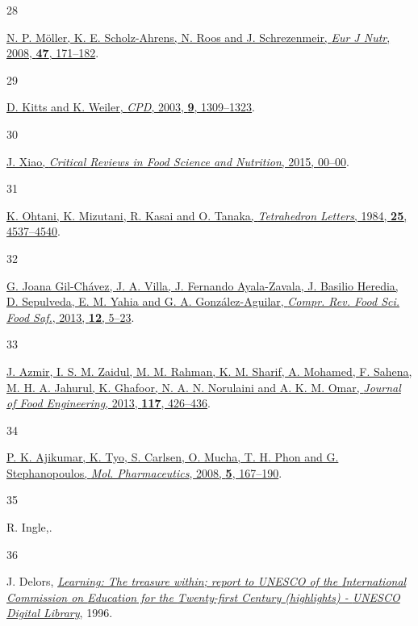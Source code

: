 \documentclass[
  letterpaper,
  DIV=11,
  numbers=noendperiod]{scrartcl}
\newlength{\cslhangindent}
\newlength{\csllabelwidth}
\newenvironment{CSLReferences}[2] %
 {\begin{list}{}{%
  \setlength{\itemindent}{0pt}
  \setlength{\leftmargin}{0pt}
  \setlength{\parsep}{0pt}
  \ifodd #1
   \setlength{\leftmargin}{\cslhangindent}
   \setlength{\itemindent}{-1\cslhangindent}
  \fi
  \setlength{\itemsep}{#2\baselineskip}}}
 {\end{list}}
\newcommand{\CSLLeftMargin}[1]{\parbox[t]{\csllabelwidth}{\strut#1\strut}}
\newcommand{\CSLRightInline}[1]{\parbox[t]{\linewidth - \csllabelwidth}{\strut#1\strut}}
\begin{document}
\begin{CSLReferences}{0}{0}
\CSLLeftMargin{28 }%
\CSLRightInline{\href{https://doi.org/10.1007/s00394-008-0710-2}{N. P.
Möller, K. E. Scholz-Ahrens, N. Roos and J. Schrezenmeir, \emph{Eur J
Nutr}, 2008, \textbf{47}, 171--182}.}

\CSLLeftMargin{29 }%
\CSLRightInline{\href{https://doi.org/10.2174/1381612033454883}{D. Kitts
and K. Weiler, \emph{CPD}, 2003, \textbf{9}, 1309--1323}.}

\CSLLeftMargin{30 }%
\CSLRightInline{\href{https://doi.org/10.1080/10408398.2015.1032400}{J.
Xiao, \emph{Critical Reviews in Food Science and Nutrition}, 2015,
00--00}.}

\CSLLeftMargin{31 }%
\CSLRightInline{\href{https://doi.org/10.1016/S0040-4039(01)81487-8}{K.
Ohtani, K. Mizutani, R. Kasai and O. Tanaka, \emph{Tetrahedron Letters},
1984, \textbf{25}, 4537--4540}.}

\CSLLeftMargin{32 }%
\CSLRightInline{\href{https://doi.org/10.1111/1541-4337.12005}{G. Joana
Gil-Chávez, J. A. Villa, J. Fernando Ayala-Zavala, J. Basilio Heredia,
D. Sepulveda, E. M. Yahia and G. A. González-Aguilar, \emph{Compr. Rev.
Food Sci. Food Saf.}, 2013, \textbf{12}, 5--23}.}

\CSLLeftMargin{33 }%
\CSLRightInline{\href{https://doi.org/10.1016/j.jfoodeng.2013.01.014}{J.
Azmir, I. S. M. Zaidul, M. M. Rahman, K. M. Sharif, A. Mohamed, F.
Sahena, M. H. A. Jahurul, K. Ghafoor, N. A. N. Norulaini and A. K. M.
Omar, \emph{Journal of Food Engineering}, 2013, \textbf{117},
426--436}.}

\CSLLeftMargin{34 }%
\CSLRightInline{\href{https://doi.org/10.1021/mp700151b}{P. K. Ajikumar,
K. Tyo, S. Carlsen, O. Mucha, T. H. Phon and G. Stephanopoulos,
\emph{Mol. Pharmaceutics}, 2008, \textbf{5}, 167--190}.}

\CSLLeftMargin{35 }%
\CSLRightInline{R. Ingle,.}

\CSLLeftMargin{36 }%
\CSLRightInline{J. Delors,
\emph{\href{https://unesdoc.unesco.org/ark:/48223/pf0000109590}{Learning:
The treasure within; report to {UNESCO} of the {International
Commission} on {Education} for the {Twenty-first Century} (highlights) -
{UNESCO Digital Library}}}, 1996.}


\end{CSLReferences}
\end{document}
